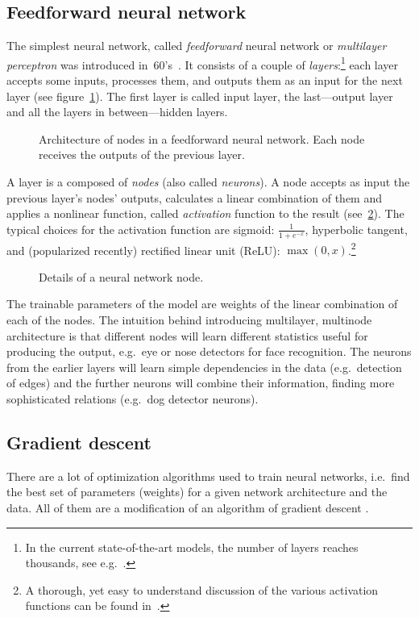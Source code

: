 \subsection{Feedforward neural network}
The simplest neural network, called \emph{feedforward} neural network or \emph{multilayer perceptron} was introduced in~60's~\cite{mlp}.
It consists of a couple of \emph{layers}:\footnote{In the current state-of-the-art models, the number of layers reaches thousands, see e.g.~\cite{stochastic}.} each layer accepts some inputs, processes them, and outputs them as an input for the next layer (see figure~\ref{ann-layers}). The first layer is called input layer, the last---output layer and all the layers in between---hidden layers.
\begin{figure}[h]
  \centering
  \resizebox{0.6\textwidth}{!}{
  
  }
  \caption{Architecture of nodes in a feedforward neural network. Each node receives the outputs of the previous layer.}\label{ann-layers} 
\end{figure}

A layer is a composed of \emph{nodes} (also called \emph{neurons}). A node accepts as input the previous layer's nodes' outputs, calculates a linear combination of them and applies a nonlinear function, called \emph{activation} function to the result (see~\ref{ann-nodes}). The typical choices for the activation function are sigmoid: $\frac{1}{1 + e^{-x}}$, hyperbolic tangent, and (popularized recently) rectified linear unit (ReLU): $\max(0, x)$.\footnote{A thorough, yet easy to understand discussion of the various activation functions can be found in~\cite{cs231-actfun}.}
\begin{figure}[h]
  \centering
  \resizebox{0.7\textwidth}{!}{
  
}
  \caption{Details of a neural network node.} \label{ann-nodes}
\end{figure}

The trainable parameters of the model are weights of the linear combination of each of the nodes. The intuition behind introducing multilayer, multinode architecture is that different nodes will learn different statistics useful for producing the output, e.g.~eye or nose detectors for face recognition. The neurons from the earlier layers will learn simple dependencies in the data (e.g.~detection of edges) and the further neurons will combine their information, finding more sophisticated relations (e.g.~dog detector neurons).

\subsection{Gradient descent}\label{gradient descent}
There are a lot of optimization algorithms used to train neural networks, i.e.~find the best set of parameters (weights) for a given network architecture and the data. All of them are a modification of an algorithm of gradient descent \cite{gradient-descent}.

